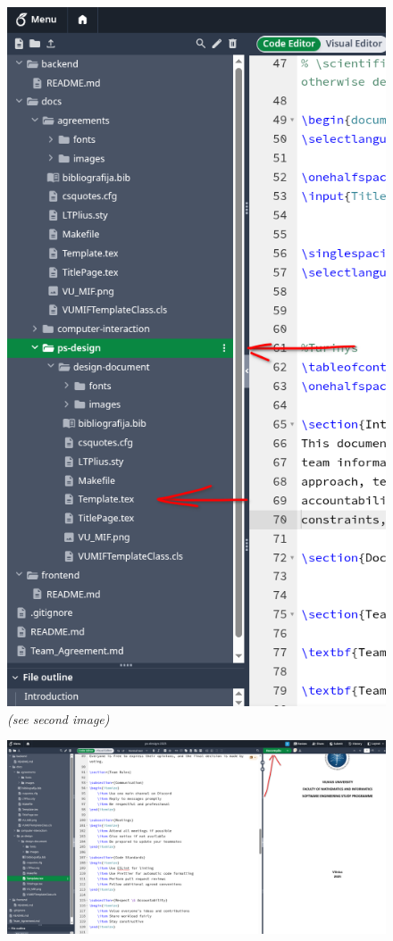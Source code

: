 \documentclass[]{VUMIFTemplateClass}
\begin{document}
\begin{figure}[H]
\begin{minipage}[t]{0.48\linewidth}
    \includegraphics[height=0.45\textheight]{images/find_folder.png}
    \\[6pt]
    \small\emph{(see second image)}
\end{minipage}
\end{figure}

\begin{figure}[H]
\centering
\includegraphics[width=0.9\linewidth]{images/compile.png}
\end{figure}
\end{document}
